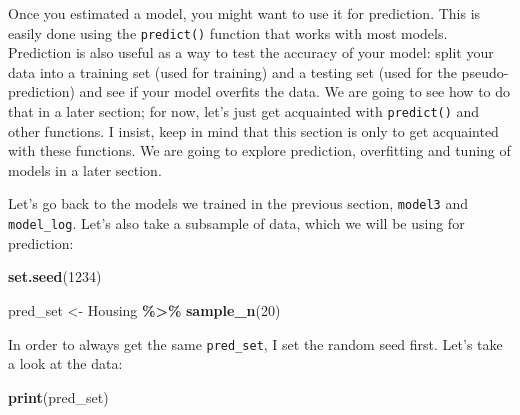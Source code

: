\documentclass[
]{article}
\newenvironment{Shaded}{\begin{snugshade}}{\end{snugshade}}
\newcommand{\DecValTok}[1]{\textcolor[rgb]{0.00,0.00,0.81}{#1}}
\newcommand{\KeywordTok}[1]{\textcolor[rgb]{0.13,0.29,0.53}{\textbf{#1}}}
\newcommand{\NormalTok}[1]{#1}
\newcommand{\OperatorTok}[1]{\textcolor[rgb]{0.81,0.36,0.00}{\textbf{#1}}}
\newcommand{\StringTok}[1]{\textcolor[rgb]{0.31,0.60,0.02}{#1}}
\begin{document}
Once you estimated a model, you might want to use it for prediction. This is easily done using the
\texttt{predict()} function that works with most models. Prediction is also useful as a way to test the
accuracy of your model: split your data into a training set (used for training) and a testing
set (used for the pseudo-prediction) and see if your model overfits the data. We are going to see
how to do that in a later section; for now, let's just get acquainted with \texttt{predict()} and other
functions. I insist, keep in mind that this section is only to get acquainted with these functions.
We are going to explore prediction, overfitting and tuning of models in a later section.

Let's go back to the models we trained in the previous section, \texttt{model3} and \texttt{model\_log}. Let's also
take a subsample of data, which we will be using for prediction:

\begin{Shaded}
\begin{Highlighting}[]
\KeywordTok{set.seed}\NormalTok{(}\DecValTok{1234}\NormalTok{)}

\NormalTok{pred\_set \textless{}{-}}\StringTok{ }\NormalTok{Housing }\OperatorTok{\%\textgreater{}\%}
\StringTok{  }\KeywordTok{sample\_n}\NormalTok{(}\DecValTok{20}\NormalTok{)}
\end{Highlighting}
\end{Shaded}

In order to always get the same \texttt{pred\_set}, I set the random seed first. Let's take a look at the
data:

\begin{Shaded}
\begin{Highlighting}[]
\KeywordTok{print}\NormalTok{(pred\_set)}
\end{Highlighting}
\end{Shaded}
\end{document}
